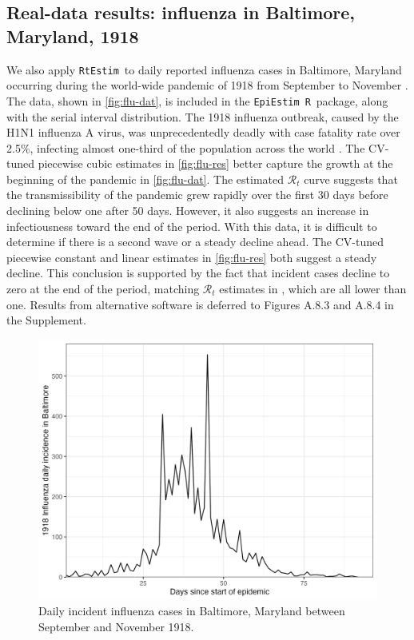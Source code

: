\documentclass[10pt,letterpaper]{article}
\newcommand{\R}{\texttt{R}}
\def\RtEstim{\texttt{RtEstim}}
\def\EpiEstim{\texttt{EpiEstim}}
\def\calR{\mathcal{R}}
\begin{document}
\subsection{Real-data results: influenza in Baltimore, Maryland, 1918}

We also apply \RtEstim\ to daily reported influenza cases in Baltimore, Maryland
occurring during the world-wide pandemic of 1918 from September to November
\cite{frost1919influenza}. The data, shown in \autoref{fig:flu-dat}, is included
in the \EpiEstim\ \R\ package, along with the serial interval distribution. The
1918 influenza outbreak, caused by the H1N1 influenza A virus, was
unprecedentedly deadly with case fatality rate over 2.5\%, infecting almost
one-third of the population across the world \cite{taubenberger20061918}. The
CV-tuned piecewise cubic estimates in \autoref{fig:flu-res} better capture the
growth at the beginning of the pandemic in \autoref{fig:flu-dat}. The estimated
$\calR_t$ curve suggests that the transmissibility of the pandemic grew rapidly
over the first 30 days before declining below one after 50 days. However, it
also suggests an increase in infectiousness toward the end of the period. With
this data, it is difficult to determine if there is a second wave or a steady
decline ahead. The CV-tuned piecewise constant and linear estimates in
\autoref{fig:flu-res} both suggest a steady decline. This conclusion is
supported by the fact that incident cases decline to zero at the end of the
period, matching $\calR_t$ estimates in \cite{cori2013new}, which are all lower
than one. Results from alternative software is deferred to Figures A.8.3 and
A.8.4 in the Supplement.

\begin{figure}[!t]
  \centering
  \includegraphics[width=0.8\linewidth]{fig/flu_dat.png}
  \caption{Daily incident influenza cases in Baltimore, Maryland between September 
  and November 1918.} 
  \label{fig:flu-dat}
\end{figure} 
\end{document}
